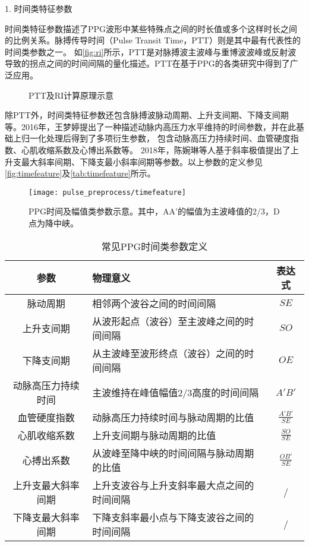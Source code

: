 1. 时间类特征参数

时间类特征参数描述了PPG波形中某些特殊点之间的时长值或多个这样时长之间的比例关系。脉搏传导时间（Pulse Transit Time，PTT）则是其中最有代表性的时间类参数之一。
如\autoref{fig:ri}所示，PTT是对脉搏波主波峰与重博波波峰或反射波导致的拐点之间的时间间隔的量化描述\cite{Brumfield2005,Su2014}。PTT在基于PPG的各类研究中得到了广泛应用。
\begin{figure}[htbp]
    \centering
    \quad
    \caption[PTT及RI计算原理示意]{\label{fig:ri}PTT及RI计算原理示意\cite{Su2014}}
\end{figure}

除PTT外，时间类特征参数还包含脉搏波脉动周期、上升支间期、下降支间期等。2016年，王梦婷提出了一种描述动脉内高压力水平维持的时间参数，并在此基础上归一化处理后得到了多项衍生参数，
包含动脉高压力持续时间、血管硬度指数、心肌收缩系数及心博出系数等\cite{mmt}。
2018年，陈婉琳等人基于斜率极值提出了上升支最大斜率间期、下降支最小斜率间期等参数\cite{cwl}。以上参数的定义参见\autoref{fig:timefeature}及\autoref{tab:timefeature}所示。
\begin{figure}[htbp]
    \centering
    \texttt{[image: pulse\_preprocess/timefeature]}
    \caption[PPG时间及幅值类参数示意]{\label{fig:timefeature}PPG时间及幅值类参数示意。其中，AA'的幅值为主波峰值的2/3，D点为降中峡。}
\end{figure}
\begin{table}[h]
    \centering
    \caption{\label{tab:timefeature}常见PPG时间类参数定义}
    \begin{tabularx}{\linewidth}{cX<{\centering}c}
    \toprule
    \textbf{参数} & \textbf{物理意义} & \textbf{表达式} \\
    \midrule
    脉动周期      &  相邻两个波谷之间的时间间隔         &  $SE$\\
    上升支间期      &  从波形起点（波谷）至主波峰之间的时间间隔         &  $SO$\\
    下降支间期      &  从主波峰至波形终点（波谷）之间的时间间隔        &  $OE$\\
    动脉高压力持续时间    &  主波维持在峰值幅值2/3高度的时间间隔         &    $A'B'$   \\
    血管硬度指数    &  动脉高压力持续时间与脉动周期的比值         &   $\frac{A'B'}{SE}$    \\
    心肌收缩系数    &  上升支间期与脉动周期的比值         &  $\frac{SO}{SE}$    \\
    心搏出系数      &   从波峰至降中峡的时间间隔与脉动周期的比值       &   $\frac{OB'}{SE}$\\
    上升支最大斜率间期      &   上升支波谷与上升支斜率最大点之间的时间间隔      &   /    \\
    下降支最大斜率间期      &   下降支斜率最小点与下降支波谷之间的时间间隔      &    /  \\
    \bottomrule
    \end{tabularx}
\end{table}

